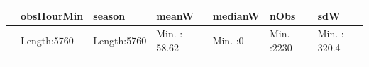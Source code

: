 \documentclass[]{article}
\begin{document}
\begin{longtable}[]{@{}lllllll@{}}
\toprule
\begin{minipage}[b]{0.03\columnwidth}\raggedright\strut
\strut
\end{minipage} & \begin{minipage}[b]{0.15\columnwidth}\raggedright\strut
obsHourMin\strut
\end{minipage} & \begin{minipage}[b]{0.15\columnwidth}\raggedright\strut
season\strut
\end{minipage} & \begin{minipage}[b]{0.13\columnwidth}\raggedright\strut
meanW\strut
\end{minipage} & \begin{minipage}[b]{0.10\columnwidth}\raggedright\strut
medianW\strut
\end{minipage} & \begin{minipage}[b]{0.12\columnwidth}\raggedright\strut
nObs\strut
\end{minipage} & \begin{minipage}[b]{0.13\columnwidth}\raggedright\strut
sdW\strut
\end{minipage}\tabularnewline
\midrule
\endhead
\begin{minipage}[t]{0.03\columnwidth}\raggedright\strut
\strut
\end{minipage} & \begin{minipage}[t]{0.15\columnwidth}\raggedright\strut
Length:5760\strut
\end{minipage} & \begin{minipage}[t]{0.15\columnwidth}\raggedright\strut
Length:5760\strut
\end{minipage} & \begin{minipage}[t]{0.13\columnwidth}\raggedright\strut
Min. : 58.62\strut
\end{minipage} & \begin{minipage}[t]{0.10\columnwidth}\raggedright\strut
Min. :0\strut
\end{minipage} & \begin{minipage}[t]{0.12\columnwidth}\raggedright\strut
Min. :2230\strut
\end{minipage} & \begin{minipage}[t]{0.13\columnwidth}\raggedright\strut
Min. : 320.4\strut
\end{minipage}\tabularnewline
\begin{minipage}[t]{0.03\columnwidth}\raggedright\strut
\strut
\end{minipage} & \begin{minipage}[t]{0.15\columnwidth}\raggedright\strut

\end{minipage}
\end{longtable}
\end{document}
